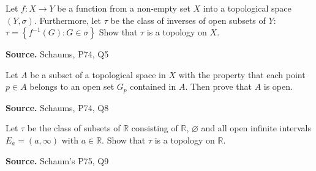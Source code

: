 \documentclass[12pt,twoside]{report}
\newenvironment*{source}{\hfill\scriptsize\textbf{Source.}\space}{\par}
\begin{document}
\begin{samepage}
\begin{ex}
Let $f \colon X \to Y$ be a function from a non-empty set $X$ into a topological space $\left (Y, \sigma\right )$.
Furthermore, let $\tau$ be the class of inverses of open subsets of $Y$:
$\tau = \left\{ f^{-1} \left (G\right )  :  G \in \sigma \right\} $
Show that $\tau$ is a topology on $X$.
\end{ex}
\begin{source}
Schaums, P74, Q5
\end{source}
\end{samepage}

\begin{samepage}
\begin{ex}
Let $A$ be a subset of a topological space in $X$ with the property that each point $p \in A$ belongs to an open set $G_p$ contained in $A$. 
Then prove that $A$ is open.
\end{ex}
\begin{source}
Schaums, P74, Q8
\end{source}
\end{samepage}

\begin{samepage}
\begin{ex}
Let $\tau$ be the class of subsets of $\mathbb{R}$ consisting of $\mathbb{R}$, $\varnothing$ and all open infinite intervals $E_a = \left (a, \infty\right )$ with $a \in \mathbb{R}$.
Show that $\tau$ is a topology on $\mathbb{R}$.
\end{ex}
\begin{source}
Schaum's P75, Q9
\end{source}
\end{samepage}
\end{document}
